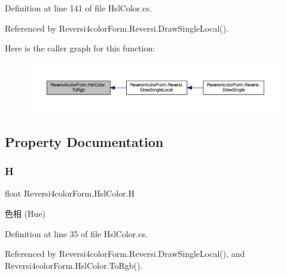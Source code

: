 Definition at line 141 of file Hsl\+Color.\+cs.



Referenced by Reversi4color\+Form.\+Reversi.\+Draw\+Single\+Local().

Here is the caller graph for this function\+:
\nopagebreak
\begin{figure}[H]
\begin{center}
\leavevmode
\includegraphics[width=350pt]{class_reversi4color_form_1_1_hsl_color_adc8d6bd6fd29eff44ccc1f2d1890fd72_icgraph}
\end{center}
\end{figure}


\subsection{Property Documentation}
\mbox{\label{class_reversi4color_form_1_1_hsl_color_a87a714cc5aa0034da10a51e6ebac4c16}} 
\subsubsection{\texorpdfstring{H}{H}}
{\footnotesize\ttfamily float Reversi4color\+Form.\+Hsl\+Color.\+H\hspace{0.3cm}{\ttfamily [get]}}



色相 (Hue) 



Definition at line 35 of file Hsl\+Color.\+cs.



Referenced by Reversi4color\+Form.\+Reversi.\+Draw\+Single\+Local(), and Reversi4color\+Form.\+Hsl\+Color.\+To\+Rgb().

\mbox{\label{class_reversi4color_form_1_1_hsl_color_a5d138402c61ef3bae7abe2c9c6d765dd}} 
